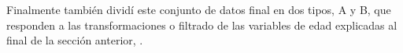 \documentclass[10 pt]{article}
\begin{document}



Finalmente también dividí este conjunto de datos final en dos tipos, A y B, que responden a las transformaciones o filtrado de las variables de edad explicadas al final de la sección anterior, . 
\end{document}
